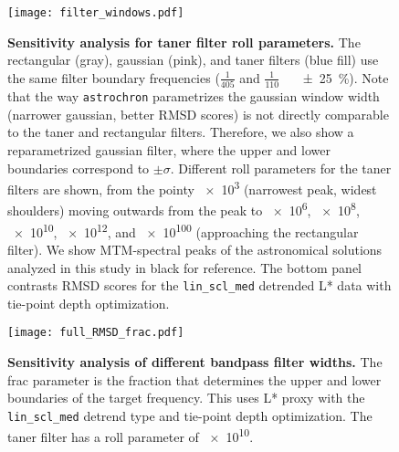 \documentclass[draft]{agujournal2019}
\begin{document}
\begin{figure}[htb]
  \centering \texttt{[image: filter\_windows.pdf]}
  \caption{\label{fig:filter-windows}
    \textbf{Sensitivity analysis for taner filter roll parameters.}
    The rectangular (gray), gaussian (pink), and taner filters (blue fill)
    use the same filter boundary frequencies (\(\frac{1}{405}\) and \(\frac{1}{110}\)~\si[per-mode=power]{\per\kiloyear} \qty{\pm25}{\percent}).
    Note that the way \texttt{astrochron} parametrizes the gaussian window width (narrower gaussian, better RMSD scores) is not directly comparable to the taner and rectangular filters.
    Therefore, we also show a reparametrized gaussian filter, where the upper and lower boundaries correspond to \(\pm\sigma\).
    Different roll parameters for the taner filters are shown,
    from the pointy \num{e3} (narrowest peak, widest shoulders) moving outwards from the peak to
    \num{e6}, \num{e8}, \num{e10}, \num{e12}, and \num{e100} (approaching the rectangular filter).
    We show MTM-spectral peaks of the astronomical solutions analyzed in this study in black for reference.
    The bottom panel contrasts \gls{RMSD} scores for the \texttt{lin\_scl\_med} detrended \gls{L*} data with tie-point depth optimization.
    }
\end{figure}

\begin{figure}[htb]
  \centering \texttt{[image: full\_RMSD\_frac.pdf]}
  \caption{\label{fig:full-RMSD-frac}
    \textbf{Sensitivity analysis of different bandpass filter widths.}
    The frac parameter is the fraction that determines the upper and lower boundaries of the target frequency.
    This uses \gls{L*} proxy with the \texttt{lin\_scl\_med} detrend type and tie-point depth optimization.
    The taner filter has a roll parameter of \num{e10}.
    }
\end{figure}
\end{document}
